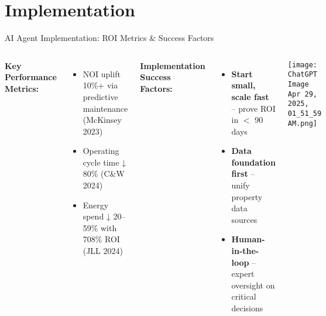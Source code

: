 \documentclass{beamer}
\begin{document}
\section{Implementation}


\begin{frame}{AI Agent Implementation: ROI Metrics \& Success Factors}
\small
  \begin{columns}
      \textbf{Key Performance Metrics:}
      \begin{itemize}
        \item NOI uplift 10\%+ via predictive maintenance {\tiny(McKinsey 2023)}
        \item Operating cycle time ↓ 80\% {\tiny(C\&W 2024)}
        \item Energy spend ↓ 20–59\% with 708\% ROI {\tiny(JLL 2024)}
      \end{itemize}
      \vspace{0.2cm}
      \small
      \textbf{Implementation Success Factors:}
      \begin{itemize}
        \item \textbf{Start small, scale fast} – prove ROI in $<$ 90 days
        \item \textbf{Data foundation first} – unify property data sources
        \item \textbf{Human-in-the-loop} – expert oversight on critical decisions
      \end{itemize}
      \centering
      \texttt{[image: ChatGPT Image Apr 29, 2025, 01\_51\_59 AM.png]}
  \end{columns}
\end{frame}
\end{document}
